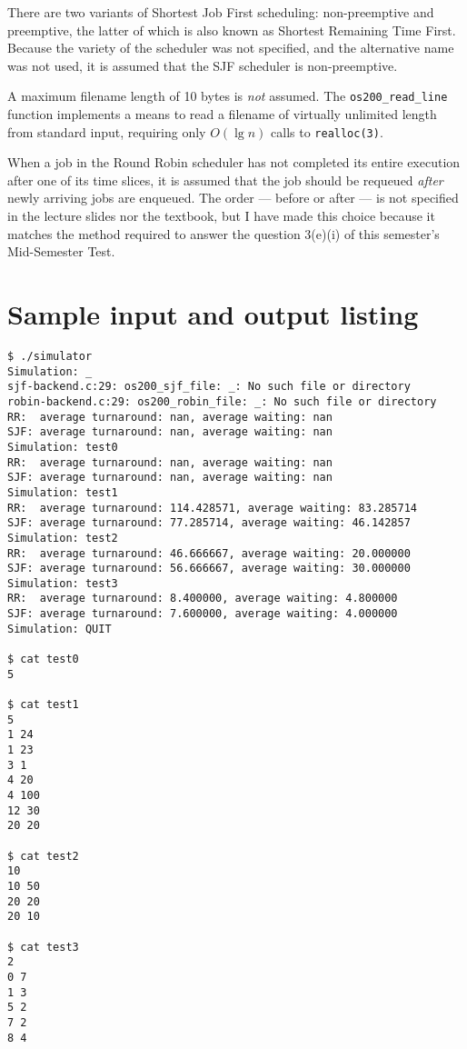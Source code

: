 \documentclass[a4paper,12pt,titlepage]{article}
\begin{document}
There are two variants of Shortest Job First scheduling: non-preemptive and
preemptive, the latter of which is also known as Shortest Remaining Time First.
Because the variety of the scheduler was not specified, and the alternative
name was not used, it is assumed that the SJF scheduler is non-preemptive.

A maximum filename length of 10 bytes is \textit{not} assumed. The
\texttt{os200\_read\_line} function implements a means to read a filename of
virtually unlimited length from standard input, requiring only $O(\lg n)$ calls
to \texttt{realloc(3)}.

When a job in the Round Robin scheduler has not completed its entire execution
after one of its time slices, it is assumed that the job should be requeued
\textit{after} newly arriving jobs are enqueued. The order --- before or after
--- is not specified in the lecture slides nor the textbook, but I have made
this choice because it matches the method required to answer the question
3(e)(i) of this semester's Mid-Semester Test.

\newpage

\section{Sample input and output listing}

\begin{lstlisting}
$ ./simulator
Simulation: _
sjf-backend.c:29: os200_sjf_file: _: No such file or directory
robin-backend.c:29: os200_robin_file: _: No such file or directory
RR:  average turnaround: nan, average waiting: nan
SJF: average turnaround: nan, average waiting: nan
Simulation: test0
RR:  average turnaround: nan, average waiting: nan
SJF: average turnaround: nan, average waiting: nan
Simulation: test1
RR:  average turnaround: 114.428571, average waiting: 83.285714
SJF: average turnaround: 77.285714, average waiting: 46.142857
Simulation: test2
RR:  average turnaround: 46.666667, average waiting: 20.000000
SJF: average turnaround: 56.666667, average waiting: 30.000000
Simulation: test3
RR:  average turnaround: 8.400000, average waiting: 4.800000
SJF: average turnaround: 7.600000, average waiting: 4.000000
Simulation: QUIT

$ cat test0
5

$ cat test1
5
1 24
1 23
3 1
4 20
4 100
12 30
20 20

$ cat test2
10
10 50
20 20
20 10

$ cat test3
2
0 7
1 3
5 2
7 2
8 4
\end{lstlisting}
\end{document}
